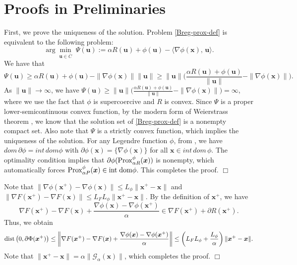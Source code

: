 \documentclass[twoside,11pt]{article}
\newcommand{\cG}{\mathcal G}
\def\norm#1{\|#1\|}
\def\inprod#1#2{\langle#1,\,#2\rangle}
\def\vu{{\bm{u}}}
\def\vx{{\bm{x}}}
\begin{document}
{\section{Proofs in Preliminaries}\label{appendix-preliminary}
First, we prove the uniqueness of the solution. Problem \eqref{Breg-prox-def} is equivalent to the following problem:
\[
\arg\min_{\vu\in\overline{C}}\;\Psi(\vu):=\alpha R(\vu)+\phi(\vu)-\inprod{\nabla\phi(\vx)}{\vu}.
\]
We have that
\[
\Psi(\vu)\geq \alpha R(\vu)
+\phi(\vu)-\norm{\nabla\phi(\vx)}\norm{\vu}
\geq\|\vu\|\Big(\frac{\alpha R(\vu)+\phi(\vu)}{\|\vu\|}-\|\nabla\phi(\vx)\|\Big).
\]
As $\|\vu\|\rightarrow\infty$, we have $\Psi(\vu)\geq\|\vu\|\Big(\frac{\alpha R(\vu)+\phi(\vu)}{\|\vu\|}-\|\nabla\phi(\vx)\|\Big)=\infty$, where we use the fact that $\phi$ is supercoercive and $R$ is convex. Since $\Psi$ is a proper lower-semicontinuous convex function, by the modern form of Weierstrass theorem \cite[Chapter 1]{rockafellar1997convex}, we know that the solution set of \eqref{Breg-prox-def} is a nonempty compact set. Also note that $\Psi$ is a strictly convex function, which implies the uniqueness of the solution. For any Legendre function $\phi$, from \cite[Chapter 26]{rockafellar1997convex}, we have $dom\,\partial\phi=int\,dom\phi$ with $\partial\phi(\vx)=\{\nabla\phi(\vx)\}$ for all $\vx\in int\,dom\,\phi$. The optimality condition implies that $\partial\phi({\rm Prox}^\phi_{\alpha R}(\vx))$ is nonempty, which automatically forces ${\rm Prox}^\phi_{\alpha P}(\vx)\in\text{int\;dom}\phi$. This completes the proof. $\Box$%


 \medskip
  Note that $\|\nabla\phi(\vx^+)-\nabla\phi(\vx)\|\leq L_\phi\|\vx^+-\vx\|$ and $\|\nabla F(\vx^+)-\nabla F(\vx)\|\leq L_FL_\phi\|\vx^+-\vx\|$.
By the definition of $\vx^+$, we have 
\[
\nabla F(\vx^+)-\nabla F(\vx)+\frac{\nabla\phi(\vx)-\nabla\phi(\vx^+)}{\alpha}\in\nabla F(\vx^+)+\partial R(\vx^+).
\]
Thus, we obtain 
\[
{\rm dist}\left(0,\partial\Phi(\vx^+)\right)\leq\bigg\|\nabla F(\vx^+)-\nabla F(\vx)+\frac{\nabla\phi(\vx)-\nabla\phi(\vx^+)}{\alpha}\bigg\|\leq\left(L_FL_\phi+\frac{L_\phi}{\alpha}\right)\|\vx^+-\vx\|.
\]
Note that $\|\vx^+-\vx\|=\alpha\|\cG_\alpha(\vx)\|$, which completes the proof. $\Box$

}
\end{document}
